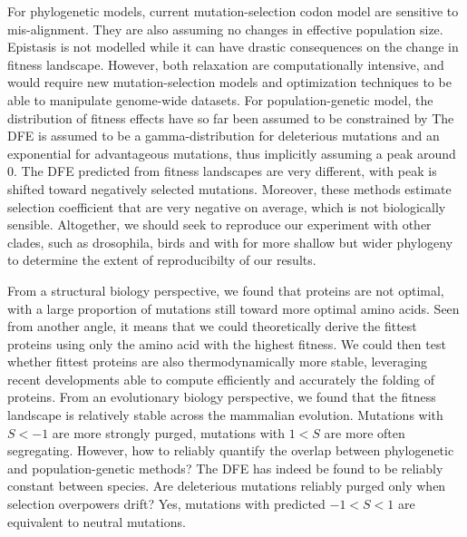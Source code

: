 \documentclass{article}
\newcommand{\Sphy}{S}
\begin{document}
    For phylogenetic models, current mutation-selection codon model are sensitive to mis-alignment.
    They are also assuming no changes in effective population size\cite{latrille_inferring_2021}.
    Epistasis is not modelled while it can have drastic consequences on the change in fitness landscape\cite{latrille_quantifying_2021}.
    However, both relaxation are computationally intensive, and would require new mutation-selection models and optimization techniques to be able to manipulate genome-wide datasets.
    For population-genetic model, the distribution of fitness effects have so far been assumed to be constrained by
    The DFE is assumed to be a gamma-distribution for deleterious mutations and an exponential for advantageous mutations, thus implicitly assuming a peak around 0.
    The DFE predicted from fitness landscapes are very different, with peak is shifted toward negatively selected mutations.
    Moreover, these methods estimate selection coefficient that are very negative on average, which is not biologically sensible.
    Altogether, we should seek to reproduce our experiment with other clades, such as drosophila, birds and with for more shallow but wider phylogeny to determine the extent of reproducibilty of our results.

    From a structural biology perspective, we found that proteins are not optimal, with a large proportion of mutations still toward more optimal amino acids.
    Seen from another angle, it means that we could theoretically derive the fittest proteins using only the amino acid with the highest fitness.
    We could then test whether fittest proteins are also thermodynamically more stable, leveraging recent developments able to compute efficiently and accurately the folding of proteins.
    From an evolutionary biology perspective, we found that the fitness landscape is relatively stable across the mammalian evolution.
    Mutations with $\Sphy<-1$ are more strongly purged, mutations with $1<\Sphy$ are more often segregating.
    However, how to reliably quantify the overlap between phylogenetic and population-genetic methods?
    The DFE has indeed be found to be reliably constant between species\cite{castellano_comparison_2019}.
    Are deleterious mutations reliably purged only when selection overpowers drift?
    Yes, mutations with predicted $-1<\Sphy<1$ are equivalent to neutral mutations.
\end{document}
